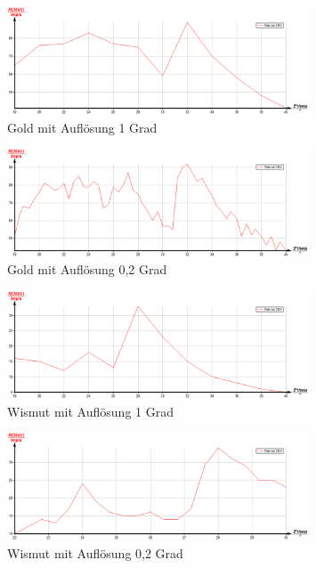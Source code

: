 \begin{figure}[H]
\includegraphics[width=0.8\textwidth] {pics/gold01.png}
\centering
\caption{Gold mit Auflösung 1 Grad}
\label{gold1}
\end{figure}

\begin{figure}[H]
\includegraphics[width=0.8\textwidth] {pics/gold02.png}
\centering
\caption{Gold mit Auflösung 0,2 Grad}
\label{gold2}
\end{figure}

\begin{figure}[H]
\includegraphics[width=0.8\textwidth] {pics/wismut01.png}
\centering
\caption{Wismut mit Auflösung 1 Grad}
\label{wism1}
\end{figure}

\begin{figure}[H]
\includegraphics[width=0.8\textwidth] {pics/wismut02.png}
\centering
\caption{Wismut mit Auflösung 0,2 Grad}
\label{wism2}
\end{figure}

